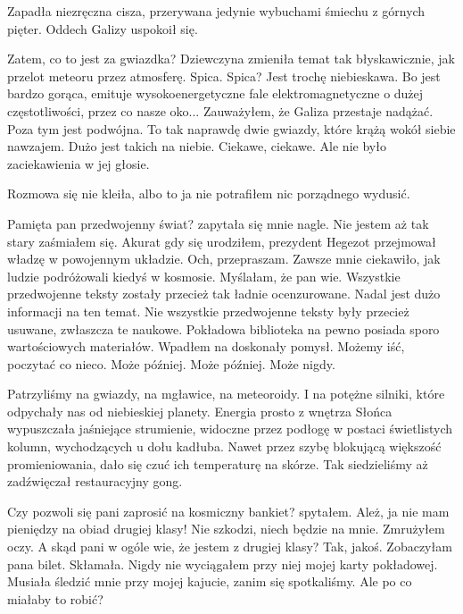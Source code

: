 Zapadła niezręczna cisza, przerywana jedynie wybuchami śmiechu z górnych pięter.
Oddech Galizy uspokoił się.

\begin{dialogue}
	\ds{} Zatem, co to jest za gwiazdka? \dm{} Dziewczyna zmieniła temat tak błyskawicznie, jak przelot meteoru przez atmosferę.
	\ds{} Spica. 
	\ds{} Spica? Jest trochę niebieskawa.
	\ds{} Bo jest bardzo gorąca, emituje wysokoenergetyczne fale elektromagnetyczne o dużej częstotliwości, przez co nasze oko... \dm{} Zauważyłem, że Galiza przestaje nadążać.
		\dm{} Poza tym jest podwójna. To tak naprawdę dwie gwiazdy, które krążą wokół siebie nawzajem. Dużo jest takich na niebie.
	\ds{} Ciekawe, ciekawe. \dm{} Ale nie było zaciekawienia w jej głosie.
\end{dialogue}

Rozmowa się nie kleiła, albo to ja nie potrafiłem nic porządnego wydusić.

\begin{dialogue}
	\ds{} Pamięta pan przedwojenny świat? \dm{} zapytała się mnie nagle. 
	\ds{} Nie jestem aż tak stary \dm{} zaśmiałem się. \dm{} Akurat gdy się urodziłem, prezydent Hegezot przejmował władzę w powojennym układzie.
	\ds{} Och, przepraszam. Zawsze mnie ciekawiło, jak ludzie podróżowali kiedyś w kosmosie. Myślałam, że pan wie. Wszystkie przedwojenne teksty zostały przecież tak ładnie ocenzurowane.
	\ds{} Nadal jest dużo informacji na ten temat. Nie wszystkie przedwojenne teksty były przecież usuwane, zwłaszcza te naukowe. Pokładowa biblioteka na pewno posiada sporo wartościowych materiałów. \dm{} Wpadłem na doskonały pomysł. \dm{} Możemy iść, poczytać co nieco.
	\ds{} Może później.
	\ds{} Może później. \dm{} Może nigdy.
\end{dialogue}

Patrzyliśmy na gwiazdy, na mgławice, na meteoroidy. I na potężne silniki, które odpychały nas od niebieskiej planety.
Energia prosto z wnętrza Słońca wypuszczała jaśniejące strumienie, widoczne przez podłogę w postaci świetlistych kolumn, wychodzących u dołu kadłuba.
Nawet przez szybę blokującą większość promieniowania, dało się czuć ich temperaturę na skórze.
Tak siedzieliśmy aż zadźwięczał restauracyjny gong.

\begin{dialogue}
	\ds{} Czy pozwoli się pani zaprosić na kosmiczny bankiet? \dm{} spytałem.
	\ds{} Ależ, ja nie mam pieniędzy na obiad drugiej klasy!
	\ds{} Nie szkodzi, niech będzie na mnie. \dm{} Zmrużyłem oczy. \dm{} A skąd pani w ogóle wie, że jestem z drugiej klasy?
	\ds{} Tak, jakoś. Zobaczyłam pana bilet. \dm{} Skłamała. Nigdy nie wyciągałem przy niej mojej karty pokładowej. Musiała śledzić mnie przy mojej kajucie, zanim się spotkaliśmy. Ale po co miałaby to robić?
\end{dialogue}

